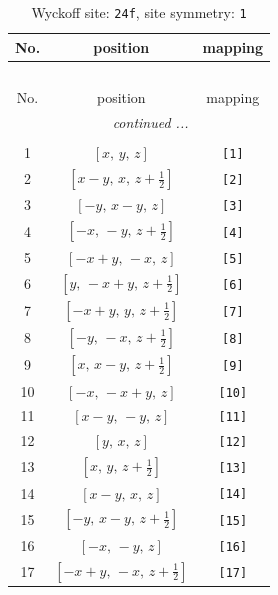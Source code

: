 \documentclass[fleqn,8pt]{jsarticle}
\begin{document}
\begin{longtable}{ccc}
\caption{Wyckoff site: {\tt 24f}, site symmetry: {\tt 1}}
 \\
 \hline \hline
No. & position & mapping \\ \hline \endfirsthead

\multicolumn{2}{l}{\tablename\ \thetable{}} \\
 \hline \hline
No. & position & mapping \\ \hline \endhead

 \hline \hline
\multicolumn{2}{r}{\footnotesize\it continued ...} \\ \endfoot

 \hline \hline
\multicolumn{2}{r}{} \\ \endlastfoot

1 & $\left[ x,\, y,\, z \right]$ & {\tt [1]} \\ \hline
2 & $\left[ x - y,\, x,\, z + \frac{1}{2} \right]$ & {\tt [2]} \\ \hline
3 & $\left[ - y,\, x - y,\, z \right]$ & {\tt [3]} \\ \hline
4 & $\left[ - x,\, - y,\, z + \frac{1}{2} \right]$ & {\tt [4]} \\ \hline
5 & $\left[ - x + y,\, - x,\, z \right]$ & {\tt [5]} \\ \hline
6 & $\left[ y,\, - x + y,\, z + \frac{1}{2} \right]$ & {\tt [6]} \\ \hline
7 & $\left[ - x + y,\, y,\, z + \frac{1}{2} \right]$ & {\tt [7]} \\ \hline
8 & $\left[ - y,\, - x,\, z + \frac{1}{2} \right]$ & {\tt [8]} \\ \hline
9 & $\left[ x,\, x - y,\, z + \frac{1}{2} \right]$ & {\tt [9]} \\ \hline
10 & $\left[ - x,\, - x + y,\, z \right]$ & {\tt [10]} \\ \hline
11 & $\left[ x - y,\, - y,\, z \right]$ & {\tt [11]} \\ \hline
12 & $\left[ y,\, x,\, z \right]$ & {\tt [12]} \\ \hline
13 & $\left[ x,\, y,\, z + \frac{1}{2} \right]$ & {\tt [13]} \\ \hline
14 & $\left[ x - y,\, x,\, z \right]$ & {\tt [14]} \\ \hline
15 & $\left[ - y,\, x - y,\, z + \frac{1}{2} \right]$ & {\tt [15]} \\ \hline
16 & $\left[ - x,\, - y,\, z \right]$ & {\tt [16]} \\ \hline
17 & $\left[ - x + y,\, - x,\, z + \frac{1}{2} \right]$ & {\tt [17]} \\ \hline

\end{longtable}
\end{document}
